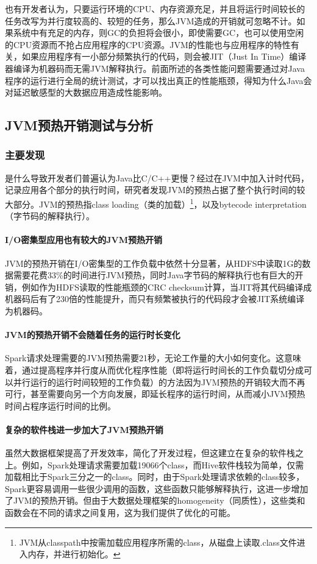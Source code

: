\documentclass[lang=cn,12pt,a4paper,cite=authoryear]{elegantpaper}
\begin{document}
也有开发者认为，只要运行环境的CPU、内存资源充足，并且将运行时间较长的任务改写为并行度较高的、较短的任务，那么JVM造成的开销就可忽略不计。如果系统中有充足的内存，则GC的负担将会很小，即使需要GC，也可以使用空闲的CPU资源而不抢占应用程序的CPU资源。JVM的性能也与应用程序的特性有关，如果应用程序有一小部分频繁执行的代码，则会被JIT（Just In Time）编译器编译为机器码而无需JVM解释执行。前面所述的各类性能问题需要通过对Java程序的运行进行全局的统计测试，才可以找出真正的性能瓶颈，得知为什么Java会对延迟敏感型的大数据应用造成性能影响。

\subsection{JVM预热开销测试与分析}
\subsubsection{主要发现}
是什么导致开发者们普遍认为Java比C/C++更慢？经过在JVM中加入计时代码，记录应用各个部分的执行时间，研究者发现JVM的预热占据了整个执行时间的较大部分。JVM的预热指class loading\cite{loading}（类的加载）\footnote{JVM从classpath中按需加载应用程序所需的class，从磁盘上读取.class文件进入内存，并进行初始化。}，以及bytecode interpretation\cite{interpreted}（字节码的解释执行）。

\paragraph{I/O密集型应用也有较大的JVM预热开销} JVM的预热开销在I/O密集型的工作负载中依然十分显著，从HDFS中读取1G的数据需要花费33\%的时间进行JVM预热，同时Java字节码的解释执行也有巨大的开销，例如作为HDFS读取的性能瓶颈的CRC checksum计算，当JIT将其代码编译成机器码后有了230倍的性能提升，而只有频繁被执行的代码段才会被JIT系统编译为机器码。

\paragraph{JVM的预热开销不会随着任务的运行时长变化} Spark请求处理需要的JVM预热需要21秒，无论工作量的大小如何变化。这意味着，通过提高程序并行度从而优化程序性能（即将运行时间长的工作负载切分成可以并行运行的运行时间较短的工作负载）的方法因为JVM预热的开销较大而不再可行，甚至需要向另一个方向发展，即延长程序的运行时间，从而减小JVM预热时间占程序运行时间的比例。

\paragraph{复杂的软件栈进一步加大了JVM预热开销} 虽然大数据框架提高了开发效率，简化了开发过程，但这建立在复杂的软件栈之上。例如，Spark处理请求需要加载19066个class，而Hive软件栈较为简单，仅需加载相比于Spark三分之一的class。同时，由于Spark处理请求依赖的class较多，Spark更容易调用一些很少调用的函数，这些函数只能够解释执行，这进一步增加了JVM的预热开销。但由于大数据处理框架的homogeneity（同质性），这些类和函数会在不同的请求之间复用，这为我们提供了优化的可能。
\end{document}
